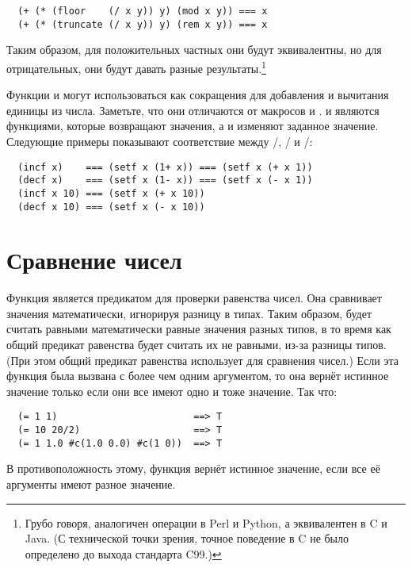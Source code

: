 \begin{verbatim}
  (+ (* (floor    (/ x y)) y) (mod x y)) === x
  (+ (* (truncate (/ x y)) y) (rem x y)) === x
\end{verbatim}

Таким образом, для положительных частных они будут эквивалентны, но для отрицательных, они
будут давать разные результаты.\footnote{Грубо говоря,  аналогичен операции
  \code{\%} в Perl и Python, а  эквивалентен \code{\%} в C и Java. (С
  технической точки зрения, точное поведение \code{\%} в C не было определено до выхода
  стандарта C99.)}

Функции  и  могут использоваться как сокращения для добавления и
вычитания единицы из числа.  Заметьте, что они отличаются от макросов  и
.   и  являются функциями, которые возвращают значения, а
 и  изменяют заданное значение.  Следующие примеры показывают
соответствие между /, / и \code{+}/\code{-}:

\begin{lstlisting}
  (incf x)    === (setf x (1+ x)) === (setf x (+ x 1))
  (decf x)    === (setf x (1- x)) === (setf x (- x 1))
  (incf x 10) === (setf x (+ x 10))
  (decf x 10) === (setf x (- x 10))
\end{lstlisting}

\section{Сравнение чисел}

Функция \code{=} является предикатом для проверки равенства чисел.  Она сравнивает
значения математически, игнорируя разницу в типах.  Таким образом, \code{=} будет считать
равными математически равные значения разных типов, в то время как общий предикат
равенства  будет считать их не равными, из-за разницы типов. (При этом общий
предикат равенства  использует \code{=} для сравнения чисел.)  Если эта
функция была вызвана с более чем одним аргументом, то она вернёт истинное значение только
если они все имеют одно и тоже значение. Так что:

\begin{verbatim}
  (= 1 1)                        ==> T
  (= 10 20/2)                    ==> T
  (= 1 1.0 #c(1.0 0.0) #c(1 0))  ==> T
\end{verbatim}

В противоположность этому, функция \code{/=} вернёт истинное значение, если все её
аргументы имеют разное значение.

